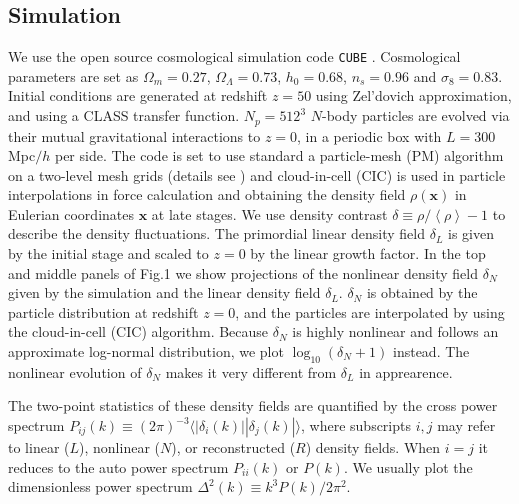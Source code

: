\documentclass[aps,prd,twocolumn,superscriptaddress,amsfont,amssymb,amsmath,nofootinbib,showpacs,balancelastpage]{revtex4-1}
\newcommand{\bs}{\boldsymbol}
\newcommand{\lb}{\left\langle}
\newcommand{\rb}{\right\rangle}
\begin{document}
\subsection{Simulation}\label{ss.sim}
We use the open source cosmological simulation code {\tt CUBE} %
\citep{cafcube}.
Cosmological parameters are set as
$\Omega_m=0.27$, $\Omega_\Lambda=0.73$, $h_0=0.68$, $n_s=0.96$ and $\sigma_8=0.83$.
Initial conditions are generated at redshift $z=50$ 
using Zel'dovich approximation, and using a CLASS transfer function.
$N_p=512^3$ $N$-body particles are evolved via 
their mutual gravitational interactions to $z=0$, in a periodic box with $L=300$ 
Mpc$/h$ per side. The code is set to use standard a particle-mesh (PM) algorithm 
\cite{1988csup.book.....H} on a two-level mesh grids
(details see \cite{2013MNRAS.436..540H}) and cloud-in-cell
(CIC) is used in particle interpolations in force 
calculation and obtaining the density field $\rho({\bs x})$ in Eulerian coordinates 
${\bs x}$ at late stages. We use density contrast $\delta\equiv\rho/\lb\rho\rb-1$ 
to describe the density fluctuations. The primordial linear density field $
\delta_L$ is given by the initial stage and scaled to $z=0$ by the linear growth 
factor. In the top and middle panels of Fig.1 we show projections of the nonlinear density field
$\delta_N$ given by the simulation and the linear density field $\delta_L$.
$\delta_N$ is obtained by the particle distribution at redshift $z=0$, and
the particles are interpolated by using the cloud-in-cell (CIC) algorithm.
Because $\delta_N$ is highly nonlinear and follows an approximate
log-normal distribution, we plot $\log_{10}(\delta_N+1)$ instead.
The nonlinear evolution of $\delta_N$ makes it very different from $\delta_L$
in apprearence.

The two-point statistics of these density fields are quantified by the cross power 
spectrum $P_{ij}(k)\equiv(2\pi)^{-3}\langle|\delta_i(k)||\delta_j(k)|\rangle$, 
where subscripts $i,j$ may refer to linear ($L$), nonlinear ($N$), or reconstructed ($R$) density 
fields. When $i=j$ it reduces to the auto power spectrum $P_{ii}(k)$ or $P(k)$. We 
usually plot the dimensionless power spectrum $\Delta^2(k)\equiv k^3P(k)/2\pi^2$. 
\end{document}
